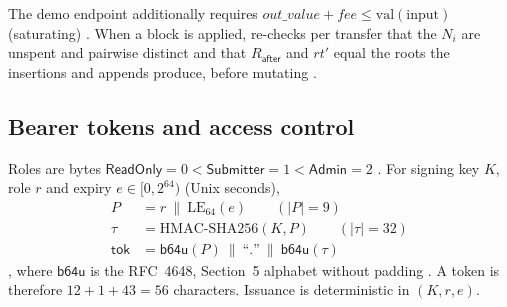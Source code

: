 The demo endpoint additionally requires
$\mathit{out\_value}+\mathit{fee}\le\mathrm{val}(\text{input})$ (saturating)
. When a block is applied, 
re-checks per transfer that the $N_i$ are unspent and pairwise distinct and
that $R_{\mathsf{after}}$ and $rt'$ equal the roots the insertions and appends
produce, before mutating .

\subsection{Bearer tokens and access control}
\label{subsec:app-token}

\begin{definition}[Token]
\label{def:app-token}
Roles are bytes $\mathsf{ReadOnly}=0 < \mathsf{Submitter}=1 <
\mathsf{Admin}=2$ . For signing key $K$,
role $r$ and expiry $e\in[0,2^{64})$ (Unix seconds),
\begin{align}
  P &= r\ \|\ \mathrm{LE}_{64}(e) \qquad (|P|=9) \\
  \tau &= \mathrm{HMAC\text{-}SHA256}(K, P) \qquad (|\tau|=32)\\
  \mathsf{tok} &= \mathsf{b64u}(P)\ \|\ \text{``.''}\ \|\ \mathsf{b64u}(\tau)
\end{align}
, where $\mathsf{b64u}$ is the
RFC~4648, Section~5 alphabet without padding
. A token is therefore $12+1+43=56$
characters. Issuance is deterministic in $(K,r,e)$.
\end{definition}

